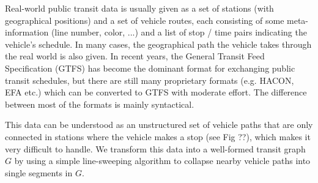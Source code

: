 \documentclass{llncs}
\begin{document}
Real-world public transit data is usually given as a set of stations (with geographical positions) and a set of vehicle routes, each consisting of some meta-information (line number, color, ...) and a list of stop / time pairs indicating the vehicle's schedule. In many cases, the geographical path the vehicle takes through the real world is also given. In recent years, the General Transit Feed Specification (GTFS) has become the dominant format for exchanging public transit schedules, but there are still many proprietary formats (e.g. HACON, EFA etc.) which can be converted to GTFS with moderate effort. The difference between most of the formats is mainly syntactical.

This data can be understood as an unstructured set of vehicle paths that are only connected in stations where the vehicle makes a stop (see Fig ??), which makes it very difficult to handle. We transform this data into a well-formed transit graph $G$ by using a simple line-sweeping algorithm to collapse nearby vehicle paths into single segments in $G$.
\end{document}
